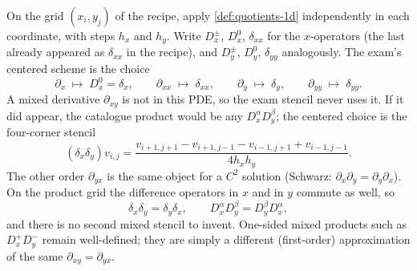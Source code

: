 \documentclass[11pt,a4paper]{article}
\begin{document}
\begin{definition}
\label{def:quotients-2d}
On the grid \((x_i,y_j)\) of the recipe, apply \cref{def:quotients-1d} independently in each coordinate, with steps \(h_x\) and \(h_y\). Write \(D_x^\pm\), \(D_x^0\), \(\delta_{xx}\) for the \(x\)-operators (the last already appeared as \(\delta_{xx}\) in the recipe), and \(D_y^\pm\), \(D_y^0\), \(\delta_{yy}\) analogously. The exam's centered scheme is the choice
\[
\partial_x
\;\mapsto\;
D_x^0=\delta_x,
\qquad
\partial_{xx}
\;\mapsto\;
\delta_{xx},
\qquad
\partial_y
\;\mapsto\;
\delta_y,
\qquad
\partial_{yy}
\;\mapsto\;
\delta_{yy}.
\]
A mixed derivative \(\partial_{xy}\) is not in this PDE, so the exam stencil never uses it. If it did appear, the catalogue product would be any \(D_x^\alpha D_y^\beta\); the centered choice is the four-corner stencil
\[
(\delta_x\delta_y)v_{i,j}
=
\frac{v_{i+1,j+1}-v_{i+1,j-1}-v_{i-1,j+1}+v_{i-1,j-1}}{4h_x h_y}.
\]
The other order \(\partial_{yx}\) is the same object for a \(C^{2}\) solution (Schwarz: \(\partial_x\partial_y=\partial_y\partial_x\)). On the product grid the difference operators in \(x\) and in \(y\) commute as well, so
\[
\delta_x\delta_y
=
\delta_y\delta_x,
\qquad
D_x^\alpha D_y^\beta
=
D_y^\beta D_x^\alpha,
\]
and there is no second mixed stencil to invent. One-sided mixed products such as \(D_x^+D_y^-\) remain well-defined; they are simply a different (first-order) approximation of the same \(\partial_{xy}=\partial_{yx}\).
\end{definition}
\end{document}
